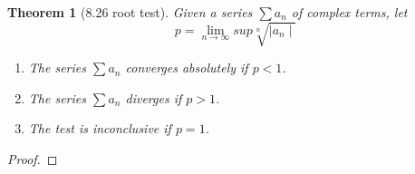 \documentclass[aps,pra,notitlepage,amsmath,amssymb,letterpaper,12pt]{revtex4-1}
\newtheorem{theorem}{Theorem}
\begin{document}
\begin{theorem}[8.26 root test]
Given a series $\sum a_{n}$ of complex terms, let
\[p = \lim_{n \to \infty} sup \sqrt[n]{\mid a_{n} \mid}\]
\begin{enumerate}[\upshape a)]
  \item The series $\sum a_{n}$ converges absolutely if $p < 1$.
  \item The series $\sum a_{n}$ diverges if $p>1$.
  \item The test is inconclusive if $p=1$.
\end{enumerate}
\end{theorem}
\begin{proof}
\end{proof}


\end{document}
